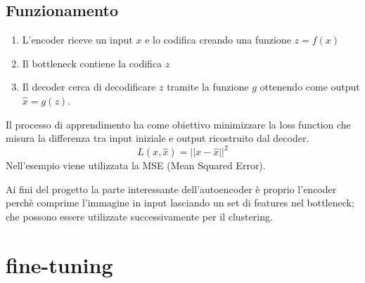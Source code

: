 \subsection{Funzionamento}
\begin{enumerate}
    \item L'encoder riceve un input \( x \) e lo codifica creando una funzione \( z= f(x) \)
    \item Il bottleneck contiene la codifica \( z \)
    \item Il decoder cerca di decodificare \( z \) tramite la funzione \( g \) ottenendo come output \( \hat{x} = g(z) \).
\end{enumerate}

Il processo di apprendimento ha come obiettivo minimizzare la loss function che misura la differenza tra input iniziale e output ricostruito dal decoder.
\[ L(x, \hat{x}) = ||x - \hat{x}||^2 \]
Nell'esempio viene utilizzata la MSE (Mean Squared Error).

Ai fini del progetto la parte interessante dell'autoencoder è proprio l'encoder perchè comprime l'immagine in input lasciando un set di features nel bottleneck; che possono essere utilizzate successivamente per il clustering.


\section{fine-tuning}





